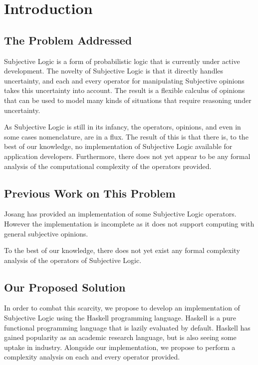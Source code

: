 \documentclass[thesis.tex]{subfiles}
\begin{document}
\chapter{Introduction}


\section{The Problem Addressed}

Subjective Logic is a form of probabilistic logic that is currently
under active development. The novelty of Subjective Logic is that it
directly handles uncertainty, and each and every operator for manipulating
Subjective opinions takes this uncertainty into account. The result is a
flexible calculus of opinions that can be used to model many kinds of
situations that require reasoning under uncertainty.

As Subjective Logic is still in its infancy, the operators, opinions, and
even in some cases nomenclature, are in a flux. The result of this is that
there is, to the best of our knowledge, no implementation of Subjective
Logic available for application developers. Furthermore, there does not
yet appear to be any formal analysis of the computational complexity of
the operators provided.


\section{Previous Work on This Problem}

Josang has provided an implementation of some Subjective Logic operators.
However the implementation is incomplete as it does not support computing
with general subjective opinions.

To the best of our knowledge, there does not yet exist any formal complexity
analysis of the operators of Subjective Logic.


\section{Our Proposed Solution}

In order to combat this scarcity, we propose to develop an implementation
of Subjective Logic using the Haskell programming language. Haskell is
a pure functional programming language that is lazily evaluated by default.
Haskell has gained popularity as an academic research language, but is also
seeing some uptake in industry. Alongside our implementation, we propose to
perform a complexity analysis on each and every operator provided.
\end{document}

